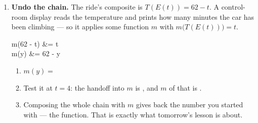 \documentclass[10pt]{article}
\begin{document}
\begin{tcolorbox}[colback=white, colframe=black!40,
    title=\textbf{Tier E --- Extension},
    fonttitle=\bfseries, arc=2mm, left=3mm, right=3mm, top=2mm, bottom=2mm]
\begin{enumerate}[itemsep=8pt]
  \item \textbf{Undo the chain.} The ride's composite is $T(E(t)) = 62 - t$.
        A control-room display reads the temperature and prints how many
        minutes the car has been climbing --- so it applies some function $m$
        with $m\big(T(E(t))\big) = t$.

        \begin{work}
          m(62 - t) &= t \\
              m(y)  &= 62 - y
        \end{work}

        \begin{enumerate}[label=(\alph*), itemsep=4pt]
          \item $m(y) = $ 
          \item Test it at $t = 4$: the handoff into $m$ is ,
                and $m$ of that is .
          \item Composing the whole chain with $m$ gives back the number you
                started with --- the  function. That is exactly
                what tomorrow's lesson is about.
        \end{enumerate}
\end{enumerate}
\end{tcolorbox}
\end{document}

